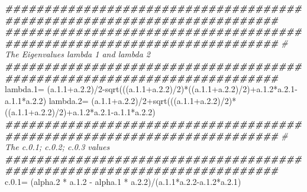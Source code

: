 \documentclass[
  10pt,
  b5paper,
]{book}
\newenvironment{Shaded}{\begin{snugshade}}{\end{snugshade}}
\newcommand{\CommentTok}[1]{\textcolor[rgb]{0.56,0.35,0.01}{\textit{#1}}}
\newcommand{\DecValTok}[1]{\textcolor[rgb]{0.00,0.00,0.81}{#1}}
\newcommand{\DocumentationTok}[1]{\textcolor[rgb]{0.56,0.35,0.01}{\textbf{\textit{#1}}}}
\newcommand{\FloatTok}[1]{\textcolor[rgb]{0.00,0.00,0.81}{#1}}
\newcommand{\FunctionTok}[1]{\textcolor[rgb]{0.00,0.00,0.00}{#1}}
\newcommand{\NormalTok}[1]{#1}
\newcommand{\OtherTok}[1]{\textcolor[rgb]{0.56,0.35,0.01}{#1}}
\newcommand{\SpecialCharTok}[1]{\textcolor[rgb]{0.00,0.00,0.00}{#1}}
\begin{document}
\begin{Shaded}
\begin{Highlighting}[]
  \DocumentationTok{\#\#\#\#\#\#\#\#\#\#\#\#\#\#\#\#\#\#\#\#\#\#\#\#\#\#\#\#\#\#\#\#\#\#\#\#\#\#\#\#\#\#\#\#\#\#\#\#\#\#\#\#\#\#\#\#\#\#\#\#\#\#\#\#\#\#\#\#\#\#\#\#\#}
  \DocumentationTok{\#\#\#\#\#\#\#\#\#\#\#\#\#\#\#\#\#\#\#\#\#\#\#\#\#\#\#\#\#\#\#\#\#\#\#\#\#\#\#\#\#\#\#\#\#\#\#\#\#\#\#\#\#\#\#\#\#\#\#\#\#\#\#\#\#\#\#\#\#\#\#\#\#}
  \CommentTok{\# The Eigenvalues lambda 1 and lambda 2}
  \DocumentationTok{\#\#\#\#\#\#\#\#\#\#\#\#\#\#\#\#\#\#\#\#\#\#\#\#\#\#\#\#\#\#\#\#\#\#\#\#\#\#\#\#\#\#\#\#\#\#\#\#\#\#\#\#\#\#\#\#\#\#\#\#\#\#\#\#\#\#\#\#\#\#\#\#\#}
\NormalTok{  lambda}\FloatTok{.1}\OtherTok{=}\NormalTok{ (a.}\FloatTok{1.1}\SpecialCharTok{+}\NormalTok{a.}\FloatTok{2.2}\NormalTok{)}\SpecialCharTok{/}\DecValTok{2}\SpecialCharTok{{-}}\FunctionTok{sqrt}\NormalTok{(((a.}\FloatTok{1.1}\SpecialCharTok{+}\NormalTok{a.}\FloatTok{2.2}\NormalTok{)}\SpecialCharTok{/}\DecValTok{2}\NormalTok{)}\SpecialCharTok{*}\NormalTok{((a.}\FloatTok{1.1}\SpecialCharTok{+}\NormalTok{a.}\FloatTok{2.2}\NormalTok{)}\SpecialCharTok{/}\DecValTok{2}\NormalTok{)}\SpecialCharTok{+}\NormalTok{a.}\FloatTok{1.2}\SpecialCharTok{*}\NormalTok{a.}\FloatTok{2.1}\SpecialCharTok{{-}}\NormalTok{a.}\FloatTok{1.1}\SpecialCharTok{*}\NormalTok{a.}\FloatTok{2.2}\NormalTok{)}
\NormalTok{  lambda}\FloatTok{.2}\OtherTok{=}\NormalTok{ (a.}\FloatTok{1.1}\SpecialCharTok{+}\NormalTok{a.}\FloatTok{2.2}\NormalTok{)}\SpecialCharTok{/}\DecValTok{2}\SpecialCharTok{+}\FunctionTok{sqrt}\NormalTok{(((a.}\FloatTok{1.1}\SpecialCharTok{+}\NormalTok{a.}\FloatTok{2.2}\NormalTok{)}\SpecialCharTok{/}\DecValTok{2}\NormalTok{)}\SpecialCharTok{*}\NormalTok{((a.}\FloatTok{1.1}\SpecialCharTok{+}\NormalTok{a.}\FloatTok{2.2}\NormalTok{)}\SpecialCharTok{/}\DecValTok{2}\NormalTok{)}\SpecialCharTok{+}\NormalTok{a.}\FloatTok{1.2}\SpecialCharTok{*}\NormalTok{a.}\FloatTok{2.1}\SpecialCharTok{{-}}\NormalTok{a.}\FloatTok{1.1}\SpecialCharTok{*}\NormalTok{a.}\FloatTok{2.2}\NormalTok{)}
  \DocumentationTok{\#\#\#\#\#\#\#\#\#\#\#\#\#\#\#\#\#\#\#\#\#\#\#\#\#\#\#\#\#\#\#\#\#\#\#\#\#\#\#\#\#\#\#\#\#\#\#\#\#\#\#\#\#\#\#\#\#\#\#\#\#\#\#\#\#\#\#\#\#\#\#\#\#}
  \CommentTok{\# The c.0.1; c.0.2; c.0.3 values}
  \DocumentationTok{\#\#\#\#\#\#\#\#\#\#\#\#\#\#\#\#\#\#\#\#\#\#\#\#\#\#\#\#\#\#\#\#\#\#\#\#\#\#\#\#\#\#\#\#\#\#\#\#\#\#\#\#\#\#\#\#\#\#\#\#\#\#\#\#\#\#\#\#\#\#\#\#\#}
\NormalTok{  c.}\FloatTok{0.1}\OtherTok{=}\NormalTok{ (alpha}\FloatTok{.2} \SpecialCharTok{*}\NormalTok{ a.}\FloatTok{1.2} \SpecialCharTok{{-}}\NormalTok{ alpha}\FloatTok{.1} \SpecialCharTok{*}\NormalTok{ a.}\FloatTok{2.2}\NormalTok{)}\SpecialCharTok{/}\NormalTok{(a.}\FloatTok{1.1}\SpecialCharTok{*}\NormalTok{a.}\FloatTok{2.2}\SpecialCharTok{{-}}\NormalTok{a.}\FloatTok{1.2}\SpecialCharTok{*}\NormalTok{a.}\FloatTok{2.1}\NormalTok{)}

\end{Highlighting}
\end{Shaded}
\end{document}
